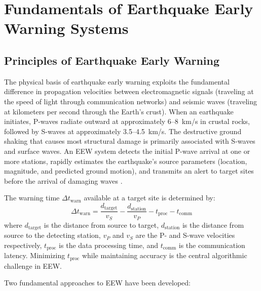 \documentclass[review,authoryear]{elsarticle}
\begin{document}
\section{Fundamentals of Earthquake Early Warning Systems}
\label{sec:eew_fundamentals}

\subsection{Principles of Earthquake Early Warning}

The physical basis of earthquake early warning exploits the fundamental difference in propagation velocities between electromagnetic signals (traveling at the speed of light through communication networks) and seismic waves (traveling at kilometers per second through the Earth's crust). When an earthquake initiates, P-waves radiate outward at approximately 6--8~km/s in crustal rocks, followed by S-waves at approximately 3.5--4.5~km/s. The destructive ground shaking that causes most structural damage is primarily associated with S-waves and surface waves. An EEW system detects the initial P-wave arrival at one or more stations, rapidly estimates the earthquake's source parameters (location, magnitude, and predicted ground motion), and transmits an alert to target sites before the arrival of damaging waves \citep{allen2003potential, satriano2011earthquake}.

The warning time $\Delta t_{\text{warn}}$ available at a target site is determined by:
\begin{equation}
\Delta t_{\text{warn}} = \frac{d_{\text{target}}}{v_S} - \frac{d_{\text{station}}}{v_P} - t_{\text{proc}} - t_{\text{comm}}
\label{eq:warning_time}
\end{equation}
where $d_{\text{target}}$ is the distance from source to target, $d_{\text{station}}$ is the distance from source to the detecting station, $v_P$ and $v_S$ are the P- and S-wave velocities respectively, $t_{\text{proc}}$ is the data processing time, and $t_{\text{comm}}$ is the communication latency. Minimizing $t_{\text{proc}}$ while maintaining accuracy is the central algorithmic challenge in EEW.

Two fundamental approaches to EEW have been developed:
\end{document}
